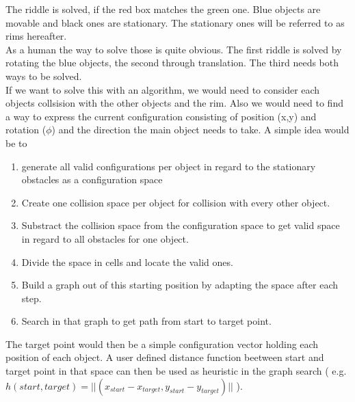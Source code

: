 The riddle is solved, if the red box matches the green one. Blue objects are movable and black ones are stationary. The stationary ones will be referred to as rims hereafter.\\
As a human the way to solve those is quite obvious. The first riddle is solved by rotating the blue objects, the second through translation. The third needs both ways to be solved.\\
If we want to solve this with an algorithm, we would need to consider each objects collsision with the other objects and the rim. Also we would need to find a way to express the current configuration consisting of position (x,y) and rotation ($\phi$) and the direction the main object needs to take. A simple idea would be to 
\begin{enumerate}
\item generate all valid configurations per object in regard to the stationary obstacles as a configuration space
\item Create one collision space per object for collision with every other object. 
\item Substract the collision space from the configuration space to get valid space in regard to all obstacles for one object.
\item Divide the space in cells and locate the valid ones.
\item Build a graph out of this starting position by adapting the space after each step.
\item Search in that graph to get path from start to target point.
\end{enumerate}

The target point would then be a simple configuration vector holding each position of each object. A user defined distance function beetween start and target point in that space can then be used as heuristic in the graph search ( e.g. $h(start,target) = || ( x_{start} -  x_{target} , y_{start} - y_{target} ) ||$ ).

